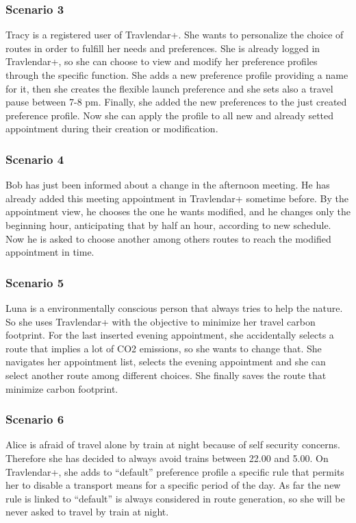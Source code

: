 	\subsubsection{Scenario 3}
	Tracy is a registered user of Travlendar+. She wants to personalize the choice of routes in order to fulfill her needs and preferences. She is already logged in Travlendar+, so she can choose to view and modify her preference profiles through the specific function. She adds a new preference profile providing a name for it, then she creates the flexible launch preference and she sets also a travel pause between 7-8 pm. Finally, she added the new preferences to the just created preference profile. Now she can apply the profile to all new and already setted appointment during their creation or modification.
	\subsubsection{Scenario 4}
	Bob has just been informed about a change in the afternoon meeting. He has already added this meeting appointment in Travlendar+ sometime before. By the appointment view, he chooses the one he wants modified, and he changes only the beginning hour, anticipating that by half an hour, according to new schedule. Now he is asked to choose another among others routes to reach the modified appointment in time.
	
	\subsubsection{Scenario 5}
	Luna is a environmentally conscious person that always tries to help the nature. So she uses Travlendar+ with the objective to minimize her travel carbon footprint. For the last inserted evening appointment, she accidentally selects a route that implies a lot of CO2 emissions, so she wants to change that. She navigates her appointment list, selects the evening appointment and she can select another route among different choices. She finally saves the route that minimize carbon footprint.
	\subsubsection{Scenario 6}
	Alice is afraid of travel alone by train at night because of self security concerns. Therefore she has decided to always avoid trains between 22.00 and 5.00. On Travlendar+, she adds to “default” preference profile a specific rule that permits her to disable a transport means for a specific period of the day. As far the new rule is linked to “default” is always considered in route generation, so she will be never asked to travel by train at night.
